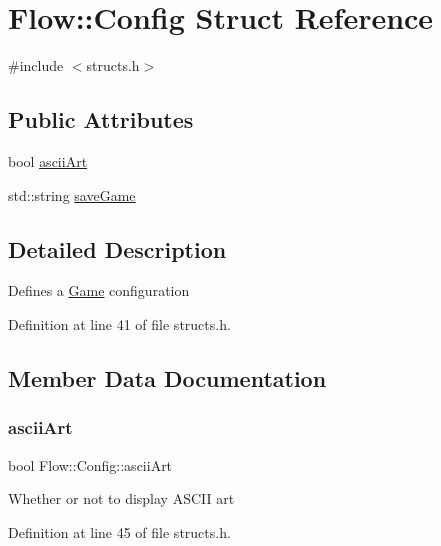 \hypertarget{struct_flow_1_1_config}{}\section{Flow\+:\+:Config Struct Reference}
\label{struct_flow_1_1_config}


{\ttfamily \#include $<$structs.\+h$>$}

\subsection*{Public Attributes}
\begin{DoxyCompactItemize}
\item 
bool \hyperlink{struct_flow_1_1_config_a695298c2ded0f1dc247cd533a98579a1}{ascii\+Art}
\item 
std\+::string \hyperlink{struct_flow_1_1_config_ae9c7f4511035a6c6dbf177435d8835c3}{save\+Game}
\end{DoxyCompactItemize}


\subsection{Detailed Description}
Defines a \hyperlink{class_flow_1_1_game}{Game} configuration 

Definition at line 41 of file structs.\+h.



\subsection{Member Data Documentation}
\hypertarget{struct_flow_1_1_config_a695298c2ded0f1dc247cd533a98579a1}{}\label{struct_flow_1_1_config_a695298c2ded0f1dc247cd533a98579a1} 
\subsubsection{\texorpdfstring{ascii\+Art}{asciiArt}}
{\footnotesize\ttfamily bool Flow\+::\+Config\+::ascii\+Art}

Whether or not to display A\+S\+C\+II art 

Definition at line 45 of file structs.\+h.

\hypertarget{struct_flow_1_1_config_ae9c7f4511035a6c6dbf177435d8835c3}{}\label{struct_flow_1_1_config_ae9c7f4511035a6c6dbf177435d8835c3} 
